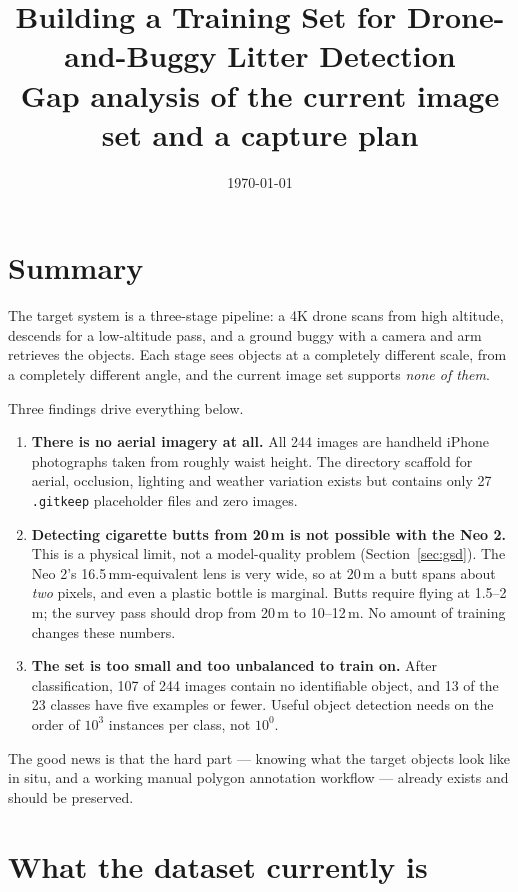 \documentclass[11pt,a4paper]{article}
\title{\textbf{Building a Training Set for Drone-and-Buggy Litter Detection}\\[2mm]
\large Gap analysis of the current image set and a capture plan}
\author{}
\date{\today}
\newcommand{\gap}[1]{\textcolor{warn}{\textbf{#1}}}
\begin{document}
\maketitle
\thispagestyle{fancy}

\section*{Summary}

The target system is a three-stage pipeline: a 4K drone scans from high altitude,
descends for a low-altitude pass, and a ground buggy with a camera and arm
retrieves the objects. Each stage sees objects at a completely different scale,
from a completely different angle, and the current image set supports
\emph{none of them}.

Three findings drive everything below.

\begin{enumerate}[leftmargin=*]
\item \gap{There is no aerial imagery at all.} All 244 images are handheld
iPhone photographs taken from roughly waist height. The directory scaffold for
aerial, occlusion, lighting and weather variation exists but contains only 27
\texttt{.gitkeep} placeholder files and zero images.

\item \gap{Detecting cigarette butts from 20\,m is not possible with the Neo 2.}
This is a physical limit, not a model-quality problem (Section~\ref{sec:gsd}).
The Neo 2's 16.5\,mm-equivalent lens is very wide, so at 20\,m a butt spans
about \emph{two} pixels, and even a plastic bottle is marginal. Butts require
flying at 1.5--2\,m; the survey pass should drop from 20\,m to 10--12\,m. No
amount of training changes these numbers.

\item \gap{The set is too small and too unbalanced to train on.} After
classification, 107 of 244 images contain no identifiable object, and 13 of the
23 classes have five examples or fewer. Useful object detection needs on the
order of $10^3$ instances per class, not $10^0$.
\end{enumerate}

The good news is that the hard part --- knowing what the target objects look like
in situ, and a working manual polygon annotation workflow --- already exists and
should be preserved.

\section{What the dataset currently is}
\end{document}
